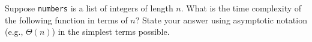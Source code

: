 \Needspace{2in}
\begin{prob}

    Suppose \texttt{numbers} is a list of integers of length $n$. What is the time complexity of the following function in terms of $n$?
    State your answer using asymptotic notation (e.g., $\Theta(n)$) in the simplest
    terms possible.

    \inputminted{python}{\thisdir/code.py}

\end{prob}
